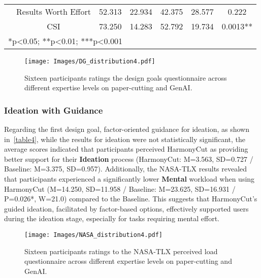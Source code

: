 \begin{table*}[!htbp]
{\begin{tabular}{ccccccc}
\multicolumn{1}{c|}{}                                                & \multicolumn{1}{c|}{Results Worth Effort} & \multicolumn{1}{c|}{52.313} & \multicolumn{1}{c|}{22.934} & \multicolumn{1}{c|}{42.375} & \multicolumn{1}{c|}{28.577} & 0.222              \\ \cline{2-7} 
\multicolumn{1}{c|}{}                                                & \multicolumn{1}{c|}{CSI}                  & \multicolumn{1}{c|}{73.250}  & \multicolumn{1}{c|}{14.283} & \multicolumn{1}{c|}{52.792} & \multicolumn{1}{c|}{19.734} & 0.0013**           \\ \hline
\multicolumn{7}{l}{*p<0.05; **p<0.01; ***p<0.001}                                   
\end{tabular}
}
\end{table*}


\begin{figure*}[!htbp]
\centering
\texttt{[image: Images/DG\_distribution4.pdf]}
\caption{\label{figure:DG}
Sixteen participants ratings the design goals questionnaire across different expertise levels on paper-cutting and GenAI.}
\end{figure*}

\subsubsection{Ideation with Guidance}
Regarding the first design goal, factor-oriented guidance for ideation, as shown in~\autoref{table4}, while the results for ideation were not statistically significant, the average scores indicated that participants perceived HarmonyCut as providing better support for their \textbf{Ideation} process (HarmonyCut: M=3.563, SD=0.727 / Baseline: M=3.375, SD=0.957). Additionally, the NASA-TLX results revealed that participants experienced a significantly lower \textbf{Mental} workload when using HarmonyCut (M=14.250, SD=11.958 / Baseline: M=23.625, SD=16.931 / P=0.026*, W=21.0) compared to the Baseline. This suggests that HarmonyCut's guided ideation, facilitated by factor-based options, effectively supported users during the ideation stage, especially for tasks requiring mental effort.

\begin{figure*}[!htbp]
\centering
\texttt{[image: Images/NASA\_distribution4.pdf]}
\caption{\label{figure:NASA}
Sixteen participants ratings to the NASA-TLX perceived load questionnaire across different expertise levels on paper-cutting and GenAI.}
\end{figure*}

